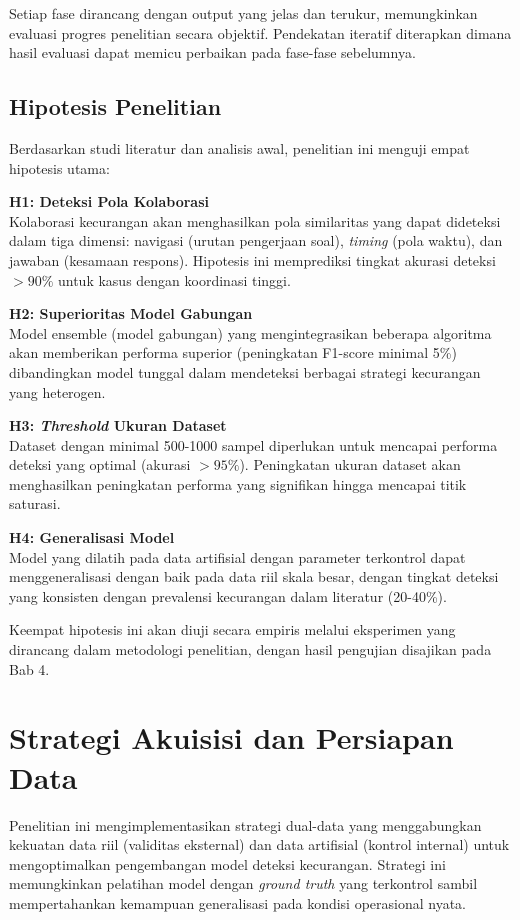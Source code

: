 Setiap fase dirancang dengan output yang jelas dan terukur, memungkinkan evaluasi progres penelitian secara objektif. Pendekatan iteratif diterapkan dimana hasil evaluasi dapat memicu perbaikan pada fase-fase sebelumnya.

\subsection{Hipotesis Penelitian}
\label{subsec:hipotesisPenelitian}
Berdasarkan studi literatur dan analisis awal, penelitian ini menguji empat hipotesis utama:

\textbf{H1: Deteksi Pola Kolaborasi}\\
Kolaborasi kecurangan akan menghasilkan pola similaritas yang dapat dideteksi dalam tiga dimensi: navigasi (urutan pengerjaan soal), \textit{timing} (pola waktu), dan jawaban (kesamaan respons). Hipotesis ini memprediksi tingkat akurasi deteksi $>90\%$ untuk kasus dengan koordinasi tinggi.

\textbf{H2: Superioritas Model Gabungan}\\
Model ensemble (model gabungan) yang mengintegrasikan beberapa algoritma akan memberikan performa superior (peningkatan F1-score minimal 5\%) dibandingkan model tunggal dalam mendeteksi berbagai strategi kecurangan yang heterogen.

\textbf{H3: \textit{Threshold} Ukuran Dataset}\\
Dataset dengan minimal 500-1000 sampel diperlukan untuk mencapai performa deteksi yang optimal (akurasi $>95\%$). Peningkatan ukuran dataset akan menghasilkan peningkatan performa yang signifikan hingga mencapai titik saturasi.

\textbf{H4: Generalisasi Model}\\
Model yang dilatih pada data artifisial dengan parameter terkontrol dapat menggeneralisasi dengan baik pada data riil skala besar, dengan tingkat deteksi yang konsisten dengan prevalensi kecurangan dalam literatur (20-40\%).

Keempat hipotesis ini akan diuji secara empiris melalui eksperimen yang dirancang dalam metodologi penelitian, dengan hasil pengujian disajikan pada Bab 4.

\section{Strategi Akuisisi dan Persiapan Data}
\label{sec:strategiAkuisisiData}
Penelitian ini mengimplementasikan strategi dual-data yang menggabungkan kekuatan data riil (validitas eksternal) dan data artifisial (kontrol internal) untuk mengoptimalkan pengembangan model deteksi kecurangan. Strategi ini memungkinkan pelatihan model dengan \textit{ground truth} yang terkontrol sambil mempertahankan kemampuan generalisasi pada kondisi operasional nyata.


